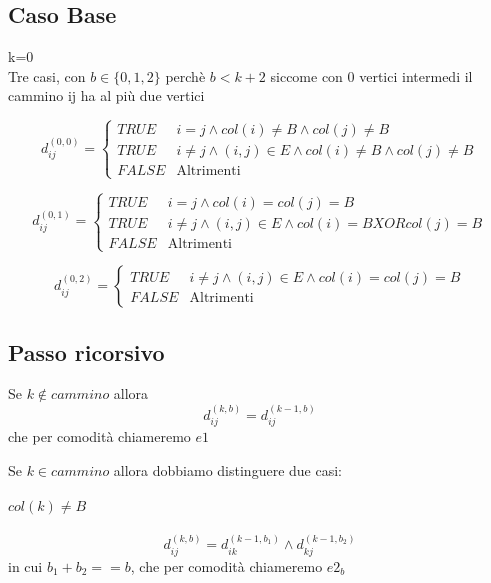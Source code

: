 \documentclass[12pt, a4paper, openany]{book}
\begin{document}
\subsection*{Caso Base} k=0\\
Tre casi, con $b \in \{0,1,2\}$ perchè $b < k+2$ siccome con 0 vertici intermedi il cammino ij ha al più due vertici

\begin{equation*}
	d_{ij}^{(0,0)} = \begin{cases}
		TRUE  & i=j\land col(i)\neq B\land col(j)\neq B                      \\
		TRUE  & i\neq j\land (i,j)\in E \land col(i)\neq B\land col(j)\neq B \\
		FALSE & \text{Altrimenti}
	\end{cases}
\end{equation*}

\begin{equation*}
	d_{ij}^{(0,1)} = \begin{cases}
		TRUE  & i=j\land col(i)= col(j) = B                          \\
		TRUE  & i\neq j\land (i,j)\in E \land col(i)= B XOR col(j)=B \\
		FALSE & \text{Altrimenti}
	\end{cases}
\end{equation*}

\begin{equation*}
	d_{ij}^{(0,2)} = \begin{cases}
		TRUE  & i\neq j\land (i,j)\in E \land col(i)= col(j)= B \\
		FALSE & \text{Altrimenti}
	\end{cases}
\end{equation*}

\subsection*{Passo ricorsivo}
Se $k \notin cammino$ allora
\begin{equation*}
	d_{ij}^{(k,b)} = d_{ij}^{(k-1,b)}
\end{equation*}
che per comodità chiameremo $e1$

Se $k \in cammino$ allora dobbiamo distinguere due casi:
\paragraph{$col(k) \neq B$}
\begin{equation*}
	d_{ij}^{(k,b)} = d_{ik}^{(k-1,b_1)} \land d_{kj}^{(k-1,b_2)}
\end{equation*}
in cui $b_1 + b_2 == b$, che per comodità chiameremo $e2_b$
\end{document}
